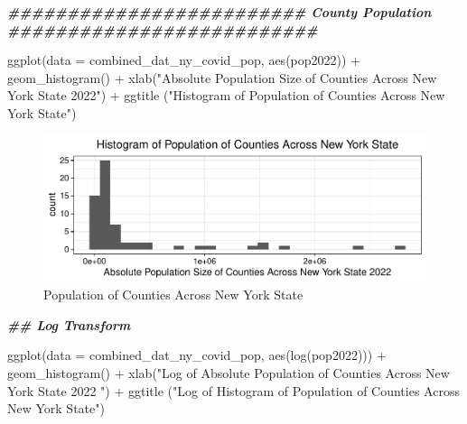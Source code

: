 \documentclass[
  12pt,
]{article}
\newenvironment{Shaded}{\begin{snugshade}}{\end{snugshade}}
\newcommand{\AttributeTok}[1]{\textcolor[rgb]{0.77,0.63,0.00}{#1}}
\newcommand{\DocumentationTok}[1]{\textcolor[rgb]{0.56,0.35,0.01}{\textbf{\textit{#1}}}}
\newcommand{\FunctionTok}[1]{\textcolor[rgb]{0.00,0.00,0.00}{#1}}
\newcommand{\NormalTok}[1]{#1}
\newcommand{\SpecialCharTok}[1]{\textcolor[rgb]{0.00,0.00,0.00}{#1}}
\newcommand{\StringTok}[1]{\textcolor[rgb]{0.31,0.60,0.02}{#1}}
\begin{document}
\begin{Shaded}
\begin{Highlighting}[]
\DocumentationTok{\#\#\#\#\#\#\#\#\#\#\#\#\#\#\#\#\#\#\#\#\#\#\#\#\# County Population \#\#\#\#\#\#\#\#\#\#\#\#\#\#\#\#\#\#\#\#\#\#\#\#\#\#}

\FunctionTok{ggplot}\NormalTok{(}\AttributeTok{data =}\NormalTok{ combined\_dat\_ny\_covid\_pop, }\FunctionTok{aes}\NormalTok{(pop2022)) }\SpecialCharTok{+}
  \FunctionTok{geom\_histogram}\NormalTok{() }\SpecialCharTok{+}
  \FunctionTok{xlab}\NormalTok{(}\StringTok{"Absolute Population Size of Counties Across New York State 2022"}\NormalTok{) }\SpecialCharTok{+}
  \FunctionTok{ggtitle}\NormalTok{ (}\StringTok{"Histogram of Population of Counties Across New York State"}\NormalTok{)}
\end{Highlighting}
\end{Shaded}

\begin{figure}

\includegraphics{EDA_Final_Group_Project_files/figure-latex/unnamed-chunk-8-1} \hfill{}

\caption{Population of Counties Across New York State}\label{fig:unnamed-chunk-8}
\end{figure}

\begin{Shaded}
\begin{Highlighting}[]
\DocumentationTok{\#\# Log Transform}

\FunctionTok{ggplot}\NormalTok{(}\AttributeTok{data =}\NormalTok{ combined\_dat\_ny\_covid\_pop, }\FunctionTok{aes}\NormalTok{(}\FunctionTok{log}\NormalTok{(pop2022))) }\SpecialCharTok{+}
  \FunctionTok{geom\_histogram}\NormalTok{() }\SpecialCharTok{+}
  \FunctionTok{xlab}\NormalTok{(}\StringTok{"Log of Absolute Population of Counties Across New York State 2022 "}\NormalTok{) }\SpecialCharTok{+}
  \FunctionTok{ggtitle}\NormalTok{ (}\StringTok{"Log of Histogram of Population of Counties Across New York State"}\NormalTok{)}
\end{Highlighting}
\end{Shaded}
\end{document}
